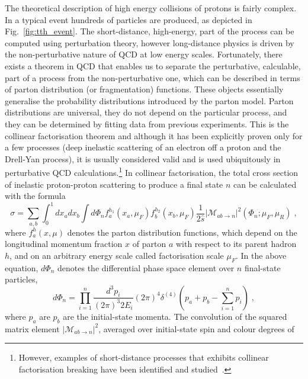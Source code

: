 The theoretical description of high energy collisions of protons is fairly complex. In a typical event hundreds of particles are produced, as depicted in Fig.~\ref{fig:tth_event}.
%
The short-distance, \ie high-energy, part of the process can be computed using perturbation theory, however long-distance physics is driven by the non-perturbative nature of QCD at low energy scales. 
%
Fortunately, there exists a theorem in QCD that enables us to separate
the perturbative, \ie calculable, part of a process from the
non-perturbative one, which can be described in terms of parton
distribution (or fragmentation) functions. These objects essentially
generalise the probability distributions introduced by the parton
model.  Parton distributions are universal, \ie they do not depend on
the particular process, and they can be determined by fitting data
from previous experiments. This is the collinear factorisation theorem
and although it has been explicitly proven only for a few processes
(deep inelastic scattering of an electron off a proton and the
Drell-Yan process), it is usually considered valid and is used
ubiquitously in perturbative QCD calculations.\footnote{However,
  examples of short-distance processes that exhibits collinear
  factorisation breaking have been identified and
  studied~\cite{Forshaw:2006fk,Forshaw:2008cq,Catani:2011st,Forshaw:2012bi}.}
%
In collinear factorisation, the total cross section of inelastic proton-proton scattering to produce a final state $n$ can be calculated with the formula 
\begin{equation}
\sigma = \sum_{a,b} \int_0^1 dx_a dx_b \int d\Phi_n f_a^{h_1}(x_a,\mu_F) f_b^{h_2}(x_b, \mu_F) \frac{1}{2 \hat{s}} |\mathcal{M}_{ab \to n}|^2(\Phi_n;\mu_F,\mu_R)\;,
\label{eq:master}
\end{equation}
where $f_a^h(x,\mu)$ denotes the parton distribution functions, which depend  on the longitudinal momentum fraction $x$ of parton $a$ with respect to its parent hadron $h$, and on an arbitrary energy scale called factorisation scale $\mu_F$. In the above equation, $d\Phi_n$ denotes the differential phase space element over $n$ final-state particles,
\begin{equation}
d\Phi_n = \prod_{i=1}^{n} \frac{d^3p_i}{(2\pi)^3 2 E_i} (2 \pi)^4 \delta^{(4)}(p_a + p_b - \sum_{i=1}^{n} p_i)\;,
\label{eq:dLIPS}
\end{equation}
where $p_a$ are $p_b$ are the initial-state momenta.
The convolution of the squared matrix element $|\mathcal{M}_{ab\to
  n}|^2$, averaged over initial-state spin and colour degrees of
